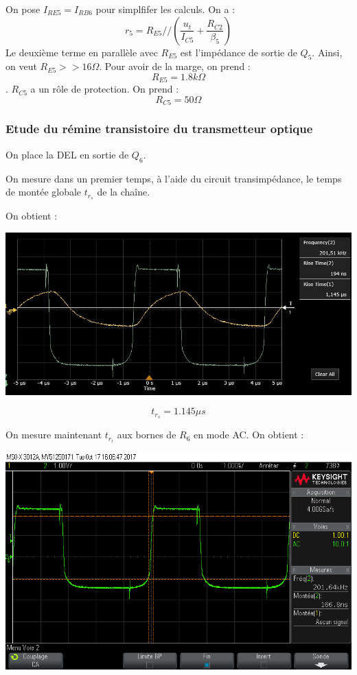 \documentclass[a4paper]{report}
\begin{document}
On pose $I_{RE5} = I_{RB6}$ pour simplfifer les calculs. On a :
$$r_5 = R_{E5} // (\dfrac{u_t}{I_{C5}} + \dfrac{R_{C2}}{\beta_5})$$
Le deuxième terme en parallèle avec $R_{E5}$ est l'impédance de sortie de $Q_5$. Ainsi, on veut $R_{E5} >> 16\Omega$. Pour avoir de la marge, on prend : 
$$R_{E5} = 1.8k\Omega$$.
$R_{C5}$ a un rôle de protection. On prend :
$$R_{C5} = 50\Omega$$

\subsubsection{Etude du rémine transistoire du transmetteur optique}

On place la DEL en sortie de $Q_6$.

On mesure dans un premier temps, à l'aide du circuit transimpédance, le temps de montée globale $t_{r_{s}}$ de la chaîne.

On obtient :

\begin{center}
\includegraphics[width=1\textwidth]{trs.JPG}
\end{center}

$$t_{r_{s}} = 1.145 \mu s$$

On mesure maintenant $t_{r_{i}}$ aux bornes de $R_6$ en mode AC. On obtient :

\begin{center}
\includegraphics[width=1\textwidth]{tri_ac.png}
\end{center}
\end{document}
